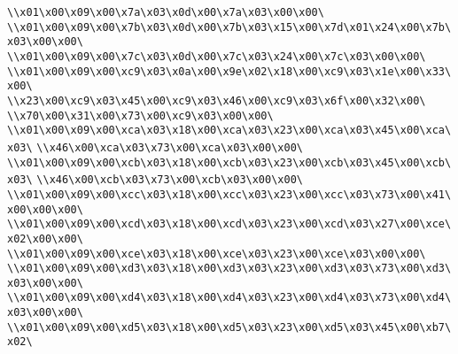 \verb|\\x01\x00\x09\x00\x7a\x03\x0d\x00\x7a\x03\x00\x00\|\newline
\verb|\\x01\x00\x09\x00\x7b\x03\x0d\x00\x7b\x03\x15\x00\x7d\x01\x24\x00\x7b\x03\x00\x00\|\newline
\verb|\\x01\x00\x09\x00\x7c\x03\x0d\x00\x7c\x03\x24\x00\x7c\x03\x00\x00\|\newline
\verb|\\x01\x00\x09\x00\xc9\x03\x0a\x00\x9e\x02\x18\x00\xc9\x03\x1e\x00\x33\x00\|\newline
\verb|\\x23\x00\xc9\x03\x45\x00\xc9\x03\x46\x00\xc9\x03\x6f\x00\x32\x00\|\newline
\verb|\\x70\x00\x31\x00\x73\x00\xc9\x03\x00\x00\|\newline
\verb|\\x01\x00\x09\x00\xca\x03\x18\x00\xca\x03\x23\x00\xca\x03\x45\x00\xca\x03\|\newline
\verb|\\x46\x00\xca\x03\x73\x00\xca\x03\x00\x00\|\newline
\verb|\\x01\x00\x09\x00\xcb\x03\x18\x00\xcb\x03\x23\x00\xcb\x03\x45\x00\xcb\x03\|\newline
\verb|\\x46\x00\xcb\x03\x73\x00\xcb\x03\x00\x00\|\newline
\verb|\\x01\x00\x09\x00\xcc\x03\x18\x00\xcc\x03\x23\x00\xcc\x03\x73\x00\x41\x00\x00\x00\|\newline
\verb|\\x01\x00\x09\x00\xcd\x03\x18\x00\xcd\x03\x23\x00\xcd\x03\x27\x00\xce\x02\x00\x00\|\newline
\verb|\\x01\x00\x09\x00\xce\x03\x18\x00\xce\x03\x23\x00\xce\x03\x00\x00\|\newline
\verb|\\x01\x00\x09\x00\xd3\x03\x18\x00\xd3\x03\x23\x00\xd3\x03\x73\x00\xd3\x03\x00\x00\|\newline
\verb|\\x01\x00\x09\x00\xd4\x03\x18\x00\xd4\x03\x23\x00\xd4\x03\x73\x00\xd4\x03\x00\x00\|\newline
\verb|\\x01\x00\x09\x00\xd5\x03\x18\x00\xd5\x03\x23\x00\xd5\x03\x45\x00\xb7\x02\|\newline
